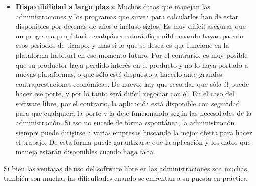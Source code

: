 \begin{itemize}
\item \textbf{Disponibilidad a largo plazo:} Muchos datos que manejan las administraciones y los programas
que sirven para calcularlos han de estar disponibles por decenas de años o incluso siglos. Es muy difícil asegurar que un programa propietario cualquiera estará disponible cuando hayan pasado esos periodos de tiempo, y más si lo que se desea es que funcione en la plataforma habitual en ese momento futuro. Por el contrario, es muy posible que su productor haya perdido interés en el producto y no lo haya portado a nuevas plataformas, o que sólo esté dispuesto a hacerlo ante grandes contraprestaciones económicas. De nuevo, hay que recordar que sólo él puede hacer ese porte, y por lo tanto será difícil negociar con él. En el caso del software libre, por el contrario, la aplicación está disponible con seguridad para que cualquiera la porte y la deje funcionando según las necesidades de la administración. Si eso no sucede de forma espontánea, la administración siempre puede dirigirse a varias empresas buscando la mejor oferta para hacer el trabajo. De esta forma puede garantizarse que la aplicación y los datos que maneja
estarán disponibles cuando haga falta.

\end{itemize}


Si bien las ventajas de uso del software libre en las administraciones son muchas, también son muchas las dificultades cuando se enfrentan a su puesta en práctica.

